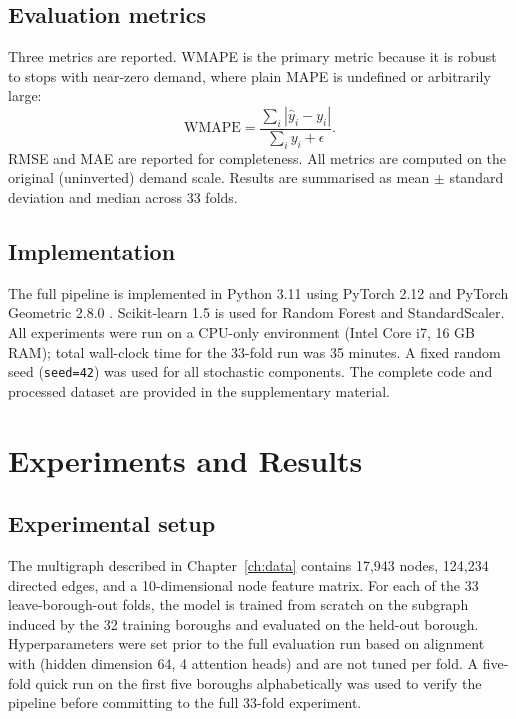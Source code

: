 \documentclass[12pt,a4paper]{report}
\begin{document}
\section{Evaluation metrics}
Three metrics are reported. WMAPE is the primary metric because it is
robust to stops with near-zero demand, where plain MAPE is undefined or
arbitrarily large:
\begin{equation}
  \mathrm{WMAPE} = \frac{\sum_i |\hat{y}_i - y_i|}{\sum_i y_i + \epsilon}.
  \label{eq:wmape}
\end{equation}
RMSE and MAE are reported for completeness. All metrics are computed on the
original (uninverted) demand scale. Results are summarised as mean $\pm$
standard deviation and median across 33 folds.

\section{Implementation}
The full pipeline is implemented in Python 3.11 using PyTorch 2.12 and PyTorch
Geometric 2.8.0 \citep{fey2019fast}. Scikit-learn 1.5 \citep{scikit2011} is
used for Random Forest and StandardScaler. All experiments were run on a
CPU-only environment (Intel Core i7, 16 GB RAM); total wall-clock time for the
33-fold run was 35 minutes. A fixed random seed (\texttt{seed=42}) was used
for all stochastic components. The complete code and processed dataset are
provided in the supplementary material.


\chapter{Experiments and Results}
\label{ch:results}

\section{Experimental setup}
The multigraph described in Chapter~\ref{ch:data} contains 17,943 nodes,
124,234 directed edges, and a 10-dimensional node feature matrix. For each of
the 33 leave-borough-out folds, the model is trained from scratch on the
subgraph induced by the 32 training boroughs and evaluated on the held-out
borough. Hyperparameters were set prior to the full evaluation run based on
alignment with \citet{zheng2025mfstgat} (hidden dimension 64, 4 attention
heads) and are not tuned per fold. A five-fold quick run on the first five
boroughs alphabetically was used to verify the pipeline before committing to
the full 33-fold experiment.
\end{document}
